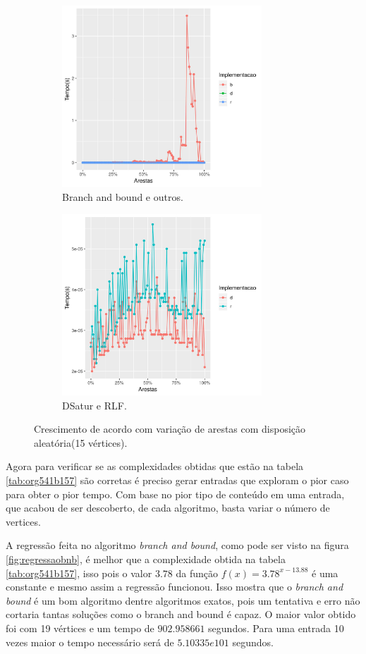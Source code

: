 \documentclass[12pt]{article}
\begin{document}
\begin{center}
\begin{figure}
\begin{subfigure}[b]{.49\linewidth}
\centering
\includegraphics[width=7.5cm]{vertice-aresta-a}
\caption{Branch and bound e outros.}\label{fig:vertice-aresta-a}
\end{subfigure}
\begin{subfigure}[b]{.49\linewidth}
\centering
\includegraphics[width=7.5cm]{vertice-aresta-b}
\caption{DSatur e RLF.}\label{fig:vertice-aresta-b}
\end{subfigure}
\caption{Crescimento de acordo com variação de arestas com disposição aleatória(15 vértices).}\label{fig:vertice-aresta}
\end{figure}
\end{center}

Agora para verificar se as complexidades obtidas que estão na tabela \ref{tab:org541b157} são corretas é preciso gerar entradas que exploram o pior caso para obter o pior tempo. Com base no pior tipo de conteúdo em uma entrada, que acabou de ser descoberto, de cada algoritmo, basta variar o número de vertices.

A regressão feita no algoritmo \emph{branch and bound}, como pode ser visto na figura \ref{fig:regressaobnb}, é melhor que a complexidade obtida na tabela \ref{tab:org541b157}, isso pois o valor \(3.78\) da função \(f(x)=3.78^{x-13.88}\) é uma constante e mesmo assim a regressão funcionou. Isso mostra que o \emph{branch and bound} é um bom algoritmo dentre algoritmos exatos, pois um tentativa e erro não cortaria tantas soluções como o branch and bound é capaz. O maior valor obtido foi com 19 vértices e um tempo de \(902.958661\) segundos. Para uma entrada 10 vezes maior o tempo necessário será de \(5.10335e101\) segundos.
\end{document}
